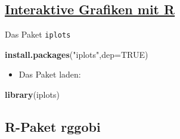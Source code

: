 \documentclass[]{article}
\newenvironment{Shaded}{\begin{snugshade}}{\end{snugshade}}
\newcommand{\KeywordTok}[1]{\textcolor[rgb]{0.13,0.29,0.53}{\textbf{{#1}}}}
\newcommand{\DataTypeTok}[1]{\textcolor[rgb]{0.13,0.29,0.53}{{#1}}}
\newcommand{\StringTok}[1]{\textcolor[rgb]{0.31,0.60,0.02}{{#1}}}
\newcommand{\CommentTok}[1]{\textcolor[rgb]{0.56,0.35,0.01}{\textit{{#1}}}}
\newcommand{\OtherTok}[1]{\textcolor[rgb]{0.56,0.35,0.01}{{#1}}}
\newcommand{\NormalTok}[1]{{#1}}
\providecommand{\tightlist}{%
  \setlength{\itemsep}{0pt}\setlength{\parskip}{0pt}}
\begin{document}
\subsection{\texorpdfstring{\href{http://www.statmethods.net/advgraphs/interactive.html}{Interaktive
Grafiken mit
R}}{Interaktive Grafiken mit R}}\label{interaktive-grafiken-mit-r}

Das Paket \texttt{iplots}

\begin{Shaded}
\begin{Highlighting}[]
\KeywordTok{install.packages}\NormalTok{(}\StringTok{"iplots"}\NormalTok{,}\DataTypeTok{dep=}\OtherTok{TRUE}\NormalTok{)}
\end{Highlighting}
\end{Shaded}

\begin{itemize}
\tightlist
\item
  Das Paket laden:
\end{itemize}

\begin{Shaded}
\begin{Highlighting}[]
\KeywordTok{library}\NormalTok{(iplots)}
\end{Highlighting}
\end{Shaded}

\begin{Shaded}
\end{Shaded}

\subsection{R-Paket rggobi}\label{r-paket-rggobi}
\end{document}
